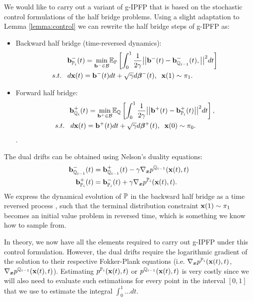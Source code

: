 \documentclass[a4paper,12pt,twoside,openright]{report}
\theoremstyle{definition}
\begin{document}
We would like to carry out a variant of g-IPFP that is based on the stochastic control formulations of the half bridge problems. Using a slight adaptation to Lemma \ref{lemma:control} we can rewrite the half bridge steps of g-IPFP as:
\begin{itemize}
\item Backward half bridge (time-reversed dynamics): 
\begin{align} \label{eq:controlled_haalf_bridge_forward}
  \rvb^{-}_{\P_{i}}(t) = \min_{\rvb^{-} \in \calB }  &\E_\P\left[\int_0^1 \frac{1}{2\gamma}\big|\big|\rvb^{-}(t) -\rvb^{-}_{\Q_{i-1}}(t), \big|\big|^2 dt\right] \nonumber \\
    s.t.\;\;\; d\rvx(t) = \rvb^{-}(t) &dt + \sqrt{\gamma} d\rvw^{-}(t), \;\; \rvx(1) \sim \pi_1.
\end{align}
\item Forward half bridge:
\begin{align} \label{eq:controlled_half_bridge_backward}
   \rvb^{+}_{\Q_{i}}(t) =\min_{\rvb^{+} \in \calB } & \E_\Q\left[\int_0^1 \frac{1}{2\gamma}\big|\big|\rvb^{+}(t) -\rvb^{+}_{\P_{i}}(t)\big|\big|^2 dt\right], \nonumber \\
    s.t.\;\;\; d\rvx(t) = \rvb^{+}(t) &dt + \sqrt{\gamma} d\rvw^{+}(t), \;\; \rvx(0) \sim \pi_0.
\end{align}.
\end{itemize}
The dual drifts can be obtained using Nelson's duality equations:
\begin{align*}
      \rvb^{-}_{\Q_{i-1}}(t)   &=\rvb^{+}_{\Q_{i-1}}(t) -\gamma\nabla_{\vx} p^{\Q_{i-1}}(\rvx(t), t) \\
    \rvb^{+}_{\P_{i}}(t) &=  \rvb^{-}_{\P_{i}}(t) +\gamma\nabla_{\vx} p^{\P_{i}}(\rvx(t), t).
\end{align*}
We express the dynamical evolution of $\P$ in the backward half bridge as a time reversed process \citep{pavon1991free, nelson1967dynamical}, such that the terminal distribution constraint $\rvx(1) \sim \pi_1$ becomes an initial value problem in reversed time, which is something we know how to sample from. 

In theory, we now have all the elements required to carry out g-IPFP under this control formulation. However, the dual drifts require the logarithmic gradient of the solution to their respective Fokker-Plank equations (i.e. $\nabla_{\vx} p^{\P_{i}}(\rvx(t), t)$, $\nabla_{\vx} p^{\Q_{i-1}}(\rvx(t), t)$). Estimating $p^{\P_{i}}(\rvx(t), t)$ or $p^{\Q_{i-1}}(\rvx(t), t)$ is very costly since we will also need to evaluate such estimations for every point in the interval $[0,1]$ that we use to estimate the integral $\int_0^1 \hdots dt$.
\end{document}
